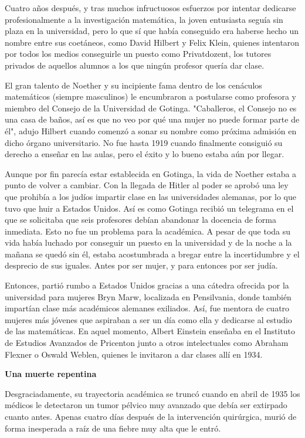 \begin{small}
Cuatro años después, y tras muchos infructuosos esfuerzos por intentar dedicarse profesionalmente a la investigación matemática, la joven entusiasta seguía sin plaza en la universidad, pero lo que sí que había conseguido era haberse hecho un nombre entre sus coetáneos, como David Hilbert y Felix Klein, quienes intentaron por todos los medios conseguirle un puesto como Privatdozent, los tutores privados de aquellos alumnos a los que ningún profesor quería dar clase. 

El gran talento de Noether y su incipiente fama dentro de los cenáculos matemáticos (siempre masculinos) le encumbraron a postularse como profesora y miembro del Consejo de la Universidad de Gotinga. "Caballeros, el Consejo no es una casa de baños, así es que no veo por qué una mujer no puede formar parte de él", adujo Hilbert cuando comenzó a sonar su nombre como próxima admisión en dicho órgano universitario. No fue hasta 1919 cuando finalmente consiguió su derecho a enseñar en las aulas, pero el éxito y lo bueno estaba aún por llegar. 
 
Aunque por fin parecía estar establecida en Gotinga, la vida de Noether estaba a punto de volver a cambiar. Con la llegada de Hitler al poder se aprobó una ley que prohibía a los judíos impartir clase en las universidades alemanas, por lo que tuvo que huir a Estados Unidos. Así es como Gotinga recibió un telegrama en el que se solicitaba que seis profesores debían abandonar la docencia de forma inmediata. Esto no fue un problema para la académica. A pesar de que toda su vida había luchado por conseguir un puesto en la universidad y de la noche a la mañana se quedó sin él, estaba acostumbrada a bregar entre la incertidumbre y el desprecio de sus iguales. Antes por ser mujer, y para entonces por ser judía. 


Entonces, partió rumbo a Estados Unidos gracias a una cátedra ofrecida por la universidad para mujeres Bryn Marw, localizada en Pensilvania, donde también impartían clase más académicos alemanes exiliados. Así, fue mentora de cuatro mujeres más jóvenes que aspiraban a ser un día como ella y dedicarse al estudio de las matemáticas. En aquel momento, Albert Einstein enseñaba en el Instituto de Estudios Avanzados de Pricenton junto a otros intelectuales como Abraham Flexner o Oswald Weblen, quienes le invitaron a dar clases allí en 1934. 

\textbf{Una muerte repentina}

Desgraciadamente, su trayectoria académica se truncó cuando en abril de 1935 los médicos le detectaron un tumor pélvico muy avanzado que debía ser extirpado cuanto antes. Apenas cuatro días después de la intervención quirúrgica, murió de forma inesperada a raíz de una fiebre muy alta que le entró.  



\end{small}
